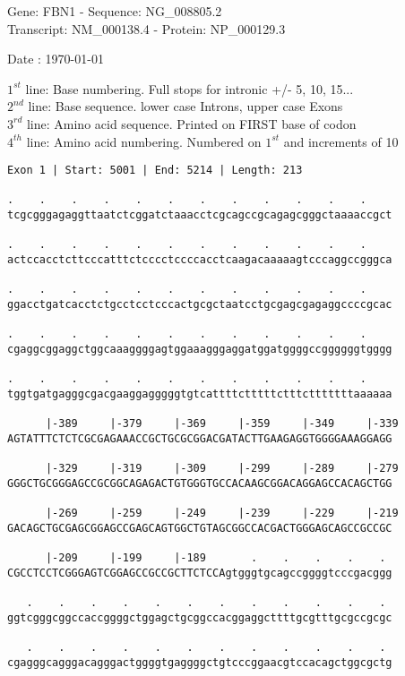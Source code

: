 \documentclass{article}
\begin{document}
\begin{center}
\begin{large}
Gene: FBN1 - Sequence: NG\_008805.2\\
Transcript: NM\_000138.4 - Protein: NP\_000129.3
 
 Date : \today
\end{large}
\end{center}
$1^{st}$ line: Base numbering. Full stops for intronic +/- 5, 10, 15...\\
$2^{nd}$ line: Base sequence. lower case Introns, upper case Exons\\
$3^{rd}$ line: Amino acid sequence. Printed on FIRST base of codon\\
$4^{th}$ line: Amino acid numbering. Numbered on $1^{st}$ and increments of 10\\
\begin{Verbatim}[fontfamily=courier]
Exon 1 | Start: 5001 | End: 5214 | Length: 213

.    .    .    .    .    .    .    .    .    .    .    .    
tcgcgggagaggttaatctcggatctaaacctcgcagccgcagagcgggctaaaaccgct

.    .    .    .    .    .    .    .    .    .    .    .    
actccacctcttcccatttctcccctccccacctcaagacaaaaagtcccaggccgggca

.    .    .    .    .    .    .    .    .    .    .    .    
ggacctgatcacctctgcctcctcccactgcgctaatcctgcgagcgagaggccccgcac

.    .    .    .    .    .    .    .    .    .    .    .    
cgaggcggaggctggcaaaggggagtggaaagggaggatggatggggccggggggtgggg

.    .    .    .    .    .    .    .    .    .    .    .    
tggtgatgagggcgacgaaggagggggtgtcattttctttttctttctttttttaaaaaa

      |-389     |-379     |-369     |-359     |-349     |-339
AGTATTTCTCTCGCGAGAAACCGCTGCGCGGACGATACTTGAAGAGGTGGGGAAAGGAGG

      |-329     |-319     |-309     |-299     |-289     |-279
GGGCTGCGGGAGCCGCGGCAGAGACTGTGGGTGCCACAAGCGGACAGGAGCCACAGCTGG

      |-269     |-259     |-249     |-239     |-229     |-219
GACAGCTGCGAGCGGAGCCGAGCAGTGGCTGTAGCGGCCACGACTGGGAGCAGCCGCCGC

      |-209     |-199     |-189       .    .    .    .    . 
CGCCTCCTCGGGAGTCGGAGCCGCCGCTTCTCCAgtgggtgcagccggggtcccgacggg

   .    .    .    .    .    .    .    .    .    .    .    . 
ggtcgggcggccaccggggctggagctgcggccacggaggcttttgcgtttgcgccgcgc

   .    .    .    .    .    .    .    .    .    .    .    . 
cgagggcagggacagggactggggtgaggggctgtcccggaacgtccacagctggcgctg

\end{Verbatim}
\end{document}
